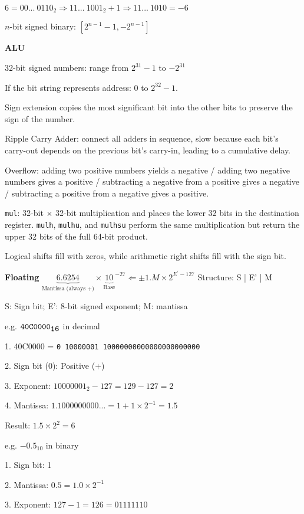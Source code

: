 \documentclass[10pt,landscape,a4paper]{article}
\begin{document}
\begin{multicols}{3}
\(6 = 00...\ 0110_2 \Rightarrow 11...\ 1001_2 + 1 \Rightarrow 11 ...\ 1010 = -6\)

\(n\)-bit signed binary: \([2^{n-1} - 1, -2^{n-1}]\)

\textbf{ALU}

32-bit signed numbers: range from \(2^{31} - 1\) to \(-2^{31}\)

If the bit string represents address: 0 to \(2^{32} - 1\).

Sign extension copies the most significant bit into the other bits to preserve the sign of the number.

Ripple Carry Adder: connect all adders in sequence, slow because each bit's carry-out depends on the previous bit's carry-in, leading to a cumulative delay.

Overflow: adding two positive numbers yields a negative / adding two negative numbers gives a positive / subtracting a negative from a positive gives a negative / subtracting a positive from a negative gives a positive.

\verb|mul|: 32-bit \(\times\) 32-bit multiplication and places the lower 32 bits in the destination register. \verb|mulh|, \verb|mulhu|, and \verb|mulhsu| perform the same multiplication but return the upper 32 bits of the full 64-bit product.

Logical shifts fill with zeros, while arithmetic right shifts fill with the sign bit.

\textbf{Floating}
\(
  \underbrace{6.6254}_{\text{Mantissa (always +)}} \times {\underbrace{10}_{\text{Base}}}^{-27} \Longleftarrow \pm 1.M \times 2^{E^{\prime} - 127}
\)
Structure: S | E' | M

S: Sign bit; E': 8-bit signed exponent; M: mantissa 

e.g. \(\verb|40C0000|_{\verb|16|}\) in decimal

1. 40C0000 = \verb|0 10000001 10000000000000000000000|
  
2. Sign bit (0): Positive (\(+\))

3. Exponent: \(10000001_2 - 127 = 129 - 127 = 2\)

4. Mantissa: \(1.1000000000... = 1 + 1 \times 2^{-1} = 1.5\)

Result: \(1.5 \times 2^2 =6\)

e.g. \(-0.5_{10}\) in binary 

1. Sign bit: 1 
  
2. Mantissa: \(0.5 = 1.0 \times 2^{-1}\)  
  
3. Exponent: \(127 - 1 = 126 = 0111 1110\)


\end{multicols}
\end{document}
